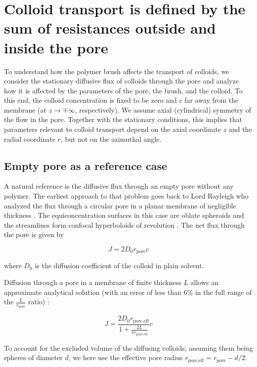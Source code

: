 \documentclass[12pt, a4paper]{article}
\begin{document}
\section{Colloid transport is defined by the sum of resistances outside and inside the pore}

To understand how the polymer brush affects the transport of colloids, we consider the stationary diffusive flux of colloids through the pore 
and analyze how it is affected by the parameters of the pore, the brush, and the colloid.
To this end, the colloid concentration is fixed to be zero and $c$ far away from the membrane (at $z\rightarrow\mp\infty$, respectively). 
We assume axial (cylindrical) symmetry of the flow in the pore. Together with the stationary conditions, 
this implies that parameters relevant to colloid transport depend on the axial coordinate $z$ and the radial coordinate $r$, but not on the azimuthal angle.

\subsection{Empty pore as a reference case}

A natural reference is the diffusive flux through an empty pore without any polymer. The earliest approach to that problem goes back to Lord Rayleigh 
who analyzed the flux through a circular pore in a planar membrane of negligible thickness \cite{Strutt1878}. 
The equiconcentration surfaces in this case are oblate spheroids and the streamlines form confocal hyperboloids of revolution \cite{Cooke1966}.
The net flux through the pore is given by

\begin{equation}
    J=2D_0r_{\text{pore}}c
    \label{eq:flux_Ral}
\end{equation}

\noindent where $D_0$ is the diffusion coefficient of the colloid in plain solvent. 

Diffusion through a pore in a membrane of finite thickness $L$ allows an approximate analytical solution (with an error of less than 6\% in the full range of the $\frac{L}{r_{\text{pore}}}$ ratio) \cite{Brunn1984}: 

\begin{equation}
    J=\frac{2D_0r_{\text{pore,eff}}}{1+\frac{2L}{\pi r_{\text{pore,eff}}}}c
    \label{eq:flux_finlength}
\end{equation}

\noindent To account for the excluded volume of the diffusing colloids, assuming them being spheres of diameter $d$, we here use the effective pore radius $r_{\text{pore,eff}}=r_{\text{pore}}-d/2$.
\end{document}
